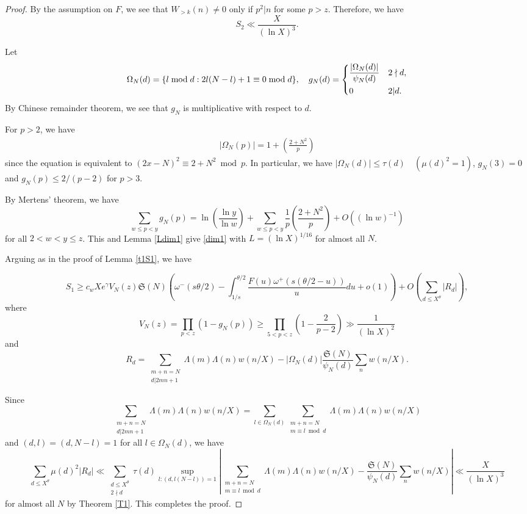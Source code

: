 \documentclass{amsart}
\theoremstyle{definition}
\theoremstyle{remark}
\newcommand{\1}{
    \bm{1}
}
\begin{document}
\begin{proof}

By the assumption on $F$, we see that $W_{>k}(n) \neq 0$ only if $p^2|n$ for some $p>z$. Therefore, we have
\[ S_{2} \ll \frac{X}{(\ln{X})^3}. \]





Let 
\[ \Omega_N(d) = \{ l \bmod d : 2l(N-l)+1 \equiv 0 \bmod d \} , \quad g_N(d) = \begin{dcases} \frac{|\Omega_N(d)|}{\psi_N(d)} & 2\nmid d, \\ 0 & 2|d. \end{dcases} \]
By Chinese remainder theorem, we see that $g_N$ is multiplicative with respect to $d$. 

For $p>2$, we have 
\begin{align*}
|\Omega_N(p)| = 1+\left( \frac{2+N^2}{p} \right)
\end{align*}
since the equation is equivalent to $(2x-N)^2 \equiv 2+N^2 \bmod p$. 
In particular, we have $|\Omega_N(d)| \leq \tau(d) \quad (\mu(d)^2=1)$, $g_N(3) = 0$ and $g_N(p) \leq 2/(p-2)$ for $p>3$. 

By Mertens' theorem, we have
\[ \sum_{w\leq p<y} g_N(p) = \ln{\left(\frac{\ln{y}}{\ln{w}}\right)} + \sum_{w\leq p<y} \frac{1}{p} \left( \frac{2+N^2}{p} \right) + O((\ln{w})^{-1}) \]
for all $2<w<y \leq z$. 
This and Lemma \ref{Ldim1} give \eqref{dim1} with $L=(\ln{X})^{1/16}$ for almost all $N$. 

Arguing as in the proof of Lemma \ref{t1S1}, we have

\[ S_1 \geq c_w X e^{\gamma} V_N(z) \mathfrak{S}(N) \left(\omega^{-}(s\theta/2) - \int_{1/s}^{\theta/2} \frac{F(u) \omega^{+}(s(\theta/2-u))}{u} du +o(1) \right) + O\left( \sum_{d \leq X^{\theta}} \left| R_{d} \right| \right), \]
where
\[ V_N(z) = \prod_{p < z} \left( 1- g_N(p) \right) \geq \prod_{5<p < z} \left( 1- \frac{2}{p-2} \right) \gg \frac{1}{(\ln{X})^2} \]
and
\[ R_d = \sum_{\substack{m+n=N \\ d|2mn+1}} \Lambda(m) \Lambda(n) w(n/X) - |\Omega_N(d)| \frac{\mathfrak{S}(N)}{\psi_N(d)} \sum_{n} w(n/X). \]


Since
\[ \sum_{\substack{m+n=N \\ d|2mn+1}} \Lambda(m) \Lambda(n) w(n/X) = \sum_{l \in \Omega_N(d)} \sum_{\substack{m+n=N \\ m \equiv l \bmod d}} \Lambda(m) \Lambda(n) w(n/X) \]
and $(d,l)=(d,N-l)=1$ for all $l \in \Omega_N(d)$, we have
\[ \sum_{d \leq X^{\theta}} \mu(d)^2 \left| R_{d} \right| \ll \sum_{\substack{d \leq X^{\theta} \\ 2 \nmid d}} \tau(d) \sup_{l:(d,l(N-l))=1} \left| \sum_{\substack{m+n=N \\ m \equiv l \bmod d}} \Lambda(m) \Lambda(n) w(n/X) - \frac{\mathfrak{S}(N)}{\psi_N(d)} \sum_{n} w(n/X) \right| \ll \frac{X}{(\ln{X})^3} \]
for almost all $N$ by Theorem \ref{T1}. This completes the proof. 


\end{proof}
\end{document}
